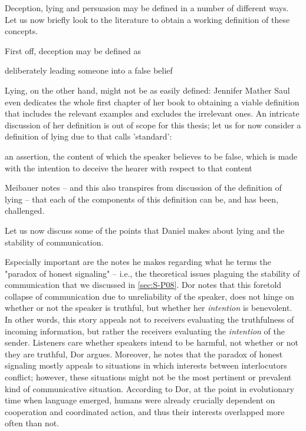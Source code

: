 Deception, lying and persuasion may be defined in a number of different ways. Let us now briefly look to the literature to obtain a working definition of these concepts.

First off, deception may be defined as
\begin{quoting}
    deliberately leading someone into a false belief
    \hfill \citep[p.~358]{Meibauer18}
\end{quoting}

Lying, on the other hand, might not be as easily defined: Jennifer Mather Saul even dedicates the whole first chapter of her \citeyear{Saul12} book to obtaining a viable definition that includes the relevant examples and excludes the irrelevant ones. An intricate discussion of her definition is out of scope for this thesis; let us for now consider a definition of lying due to \citet{Williams02} that \citet{Meibauer18} calls 'standard':
\begin{quoting}
    an assertion, the content of which the speaker believes to be false, which is made with the intention to deceive the hearer with respect to that content
    \hfill \citep[p.~96]{Williams02}
\end{quoting}
Meibauer notes -- and this also transpires from  discussion of the definition of lying -- that each of the components of this definition can be, and has been, challenged.

Let us now discuss some of the points that Daniel \citet{Dor17} makes about lying and the stability of communication.

Especially important are the notes he makes regarding what he terms the "paradox of honest signaling" \citep[p.~46]{Dor17} -- i.e., the theoretical issues plaguing the stability of communication that we discussed in \cref{sec:S-P08}. 
Dor notes that this foretold collapse of communication due to unreliability of the speaker, does not hinge on whether or not the speaker is truthful, but whether her \emph{intention} is benevolent.
In other words, this story appeals not to receivers evaluating the truthfulness of incoming information, but rather the receivers evaluating the \emph{intention} of the sender. Listeners care whether speakers intend to be harmful, not whether or not they are truthful, Dor argues.
Moreover, he notes that the paradox of honest signaling mostly appeals to situations in which interests between interlocutors conflict; however, these situations might not be the most pertinent or prevalent kind of communicative situation.
According to Dor, at the point in evolutionary time when language emerged, humans were already crucially dependent on cooperation and coordinated action, and thus their interests overlapped more often than not.

